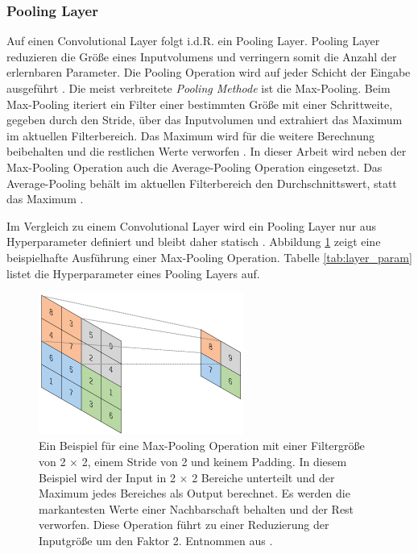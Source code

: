 \subsubsection{Pooling Layer}
Auf einen Convolutional Layer folgt i.d.R. ein Pooling Layer. Pooling Layer reduzieren die Größe eines Inputvolumens und verringern somit die Anzahl der erlernbaren Parameter. Die Pooling Operation wird auf jeder Schicht der Eingabe ausgeführt \cite{CS231nConvolutionalNeurala}. Die meist verbreitete \textit{Pooling Methode} ist die Max-Pooling. Beim Max-Pooling iteriert ein Filter einer bestimmten Größe mit einer Schrittweite, gegeben durch den Stride, über das Inputvolumen und extrahiert das Maximum im aktuellen Filterbereich. Das Maximum wird für die weitere Berechnung beibehalten und die restlichen Werte verworfen
 \cite{CS231nConvolutionalNeurala}. In dieser Arbeit wird neben der Max-Pooling Operation auch die Average-Pooling Operation eingesetzt. Das Average-Pooling behält im aktuellen Filterbereich den Durchschnittswert, statt das Maximum \cite{CS231nConvolutionalNeurala}.
 
 Im Vergleich zu einem Convolutional Layer wird ein Pooling Layer nur aus Hyperparameter definiert und bleibt daher statisch \cite{yamashitaConvolutionalNeuralNetworks2018}. Abbildung \ref{fig:pooling_layer} zeigt eine beispielhafte Ausführung einer Max-Pooling Operation. Tabelle \ref{tab:layer_param} listet die Hyperparameter eines Pooling Layers auf.
 \vspace*{1cm}
 \begin{figure}[H]
	\centering
	\includegraphics[width=0.6\textwidth]{images/max_pool.png}
	\caption{Ein Beispiel für eine Max-Pooling Operation mit einer Filtergröße von 2 $\times$ 2, einem Stride von 2 und keinem Padding. In diesem Beispiel wird der Input in 2 $\times$ 2 Bereiche unterteilt und der Maximum jedes Bereiches als Output berechnet. Es werden die markantesten Werte einer Nachbarschaft behalten und der Rest verworfen. Diese Operation führt zu einer Reduzierung der Inputgröße um den Faktor 2. Entnommen aus \cite{yamashitaConvolutionalNeuralNetworks2018}.}
	\label{fig:pooling_layer}
\end{figure}



